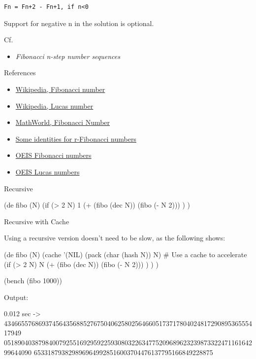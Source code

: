 \begin{verbatim}
Fn = Fn+2 - Fn+1, if n<0
\end{verbatim}

Support for negative n in the solution is optional.

\begin{description}
\item[Cf.]
\end{description}

\begin{itemize}
\item \emph{Fibonacci n-step number sequences‎}
\end{itemize}

\begin{description}
\item[References]
\end{description}

\begin{itemize}
\item
  \href{http://en.wikipedia.org/wiki/Fibonacci\_number}{Wikipedia,
  Fibonacci number}
\item
  \href{http://en.wikipedia.org/wiki/Lucas\_number}{Wikipedia, Lucas
  number}
\item
  \href{http://mathworld.wolfram.com/FibonacciNumber.html}{MathWorld,
  Fibonacci Number}
\item
  \href{http://www.math-cs.ucmo.edu/~curtisc/articles/howardcooper/genfib4.pdf}{Some
  identities for r-Fibonacci numbers}
\item
  \href{http://oeis.org/A000045}{OEIS Fibonacci numbers}
\item
  \href{http://oeis.org/A000032}{OEIS Lucas numbers}
\end{itemize}


\begin{wideverbatim}

Recursive

(de fibo (N)
   (if (> 2 N)
      1
      (+ (fibo (dec N)) (fibo (- N 2))) ) )

Recursive with Cache

Using a recursive version doesn't need to be slow, as the following shows:

(de fibo (N)
   (cache '(NIL) (pack (char (hash N)) N)  # Use a cache to accelerate
      (if (> 2 N)
         N
         (+ (fibo (dec N)) (fibo (- N 2))) ) ) )

(bench (fibo 1000))

Output:

0.012 sec
-> 43466557686937456435688527675040625802564660517371780402481729089536555417949
05189040387984007925516929592259308032263477520968962323987332247116164299644090
6533187938298969649928516003704476137795166849228875

\end{wideverbatim}

